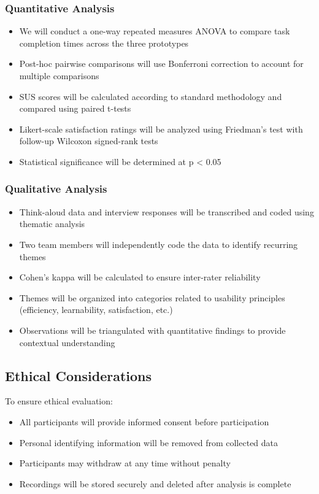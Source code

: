 \documentclass[
	letterpaper, %
]{jdf}
\begin{document}
\subsubsection{Quantitative Analysis}
\begin{itemize}
    \item We will conduct a one-way repeated measures ANOVA to compare task completion times across the three prototypes
    \item Post-hoc pairwise comparisons will use Bonferroni correction to account for multiple comparisons
    \item SUS scores will be calculated according to standard methodology and compared using paired t-tests
    \item Likert-scale satisfaction ratings will be analyzed using Friedman's test with follow-up Wilcoxon signed-rank tests
    \item Statistical significance will be determined at p < 0.05
\end{itemize}

\subsubsection{Qualitative Analysis}
\begin{itemize}
    \item Think-aloud data and interview responses will be transcribed and coded using thematic analysis
    \item Two team members will independently code the data to identify recurring themes
    \item Cohen's kappa will be calculated to ensure inter-rater reliability
    \item Themes will be organized into categories related to usability principles (efficiency, learnability, satisfaction, etc.)
    \item Observations will be triangulated with quantitative findings to provide contextual understanding
\end{itemize}

\subsection{Ethical Considerations}

To ensure ethical evaluation:
\begin{itemize}
    \item All participants will provide informed consent before participation
    \item Personal identifying information will be removed from collected data
    \item Participants may withdraw at any time without penalty
    \item Recordings will be stored securely and deleted after analysis is complete
\end{itemize}
\end{document}
